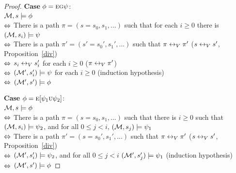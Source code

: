 \documentclass{article}
\begin{document}
\begin{proof}
\textbf{Case} $\phi = \textsc{e} \textsc{g} \psi$:\\
${\cal M}, s \models \phi$ \\
$\Leftrightarrow$ There is a path $\pi =(s=s_0, s_1, ...)$ such that for each $i \geq 0$ there is $({\cal M}, s_i) \models \psi$\\
$\Leftrightarrow$ There is a path $\pi' = (s'=s_0', s_1', ...)$ such that $\pi \leftrightarrow_V \pi'$   \hfill ($s \leftrightarrow_V s'$, Proposition~\ref{div})\\
$\Leftrightarrow$ $s_i \leftrightarrow_V s_i'$ for each $i \geq 0$ \hfill ($\pi \leftrightarrow_V \pi'$)\\
$\Leftrightarrow$ $({\cal M}', s_i') \models \psi$ for each $i \geq 0$  \hfill  (induction hypothesis)\\
$\Leftrightarrow$ $({\cal M}', s') \models \phi$

\textbf{Case} $\phi = \textsc{e} [\psi_1 \textsc{u} \psi_2]$:\\
${\cal M}, s \models \phi$ \\
$\Leftrightarrow$ There is a path $\pi= (s=s_0, s_1, ...)$ such that there is $i \geq 0$ such that $({\cal M}, s_i) \models \psi_2$, and for all $0 \leq j < i$, $({\cal M}, s_j) \models \psi_1$\\
$\Leftrightarrow$ There is a path $\pi' = (s=s_0', s_1', ...)$ such that $\pi \leftrightarrow_V \pi'$  \hfill  ($s \leftrightarrow_V s'$, Proposition~\ref{div})\\
$\Leftrightarrow$ $({\cal M}', s_i') \models \psi_2$, and for all $0 \leq j < i$ $({\cal M}', s_j') \models \psi_1$   \hfill   (induction hypothesis)\\
$\Leftrightarrow$ $({\cal M}', s') \models \phi$
\end{proof}
\end{document}

